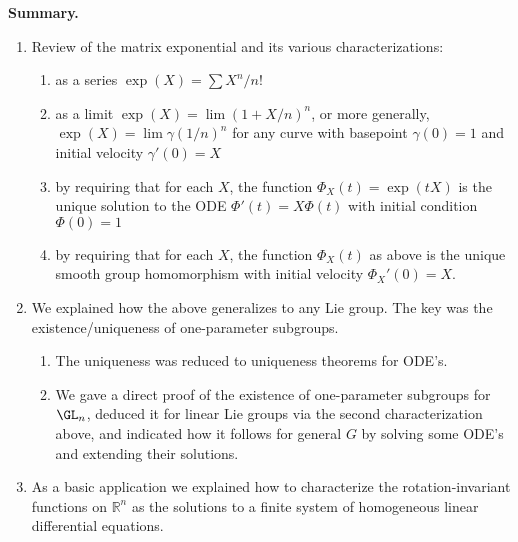\documentclass[reqno]{amsart} 
\begin{document}
\textbf{Summary.}
\begin{enumerate}
\item Review of the matrix exponential and its various characterizations:
  \begin{enumerate}
  \item as a series \(\exp(X) = \sum X^n/n!\)
  \item as a limit \(\exp(X) = \lim (1 + X/n)^n\), or more generally, \(\exp(X) = \lim \gamma(1/n)^n\) for any curve with basepoint \(\gamma(0) = 1\) and initial velocity \(\gamma'(0) = X\)
  \item by requiring that for each \(X\), the function \(\Phi_X(t) = \exp(t X)\) is the unique solution to the ODE \(\Phi'(t) = X \Phi(t)\) with initial condition \(\Phi(0) = 1\)
  \item by requiring that for each \(X\), the function \(\Phi_X(t)\) as above is the unique smooth group homomorphism with initial velocity \(\Phi_X'(0) = X\).
  \end{enumerate}
\item We explained how the above generalizes to any Lie group.  The key was the existence/uniqueness of one-parameter subgroups.
  \begin{enumerate}
  \item The uniqueness was reduced to uniqueness theorems for ODE's.
  \item We gave a direct proof of the existence of one-parameter subgroups for \(\GL_n\), deduced it for linear Lie groups via the second characterization above, and indicated how it follows for general \(G\) by solving some ODE's and extending their solutions.
  \end{enumerate}
\item As a basic application we explained how to characterize the rotation-invariant functions on \(\mathbb{R}^n\) as the solutions to a finite system of homogeneous linear differential equations.
\end{enumerate}
\end{document}
